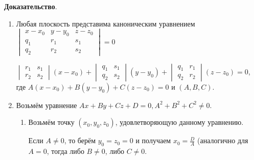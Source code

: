 \documentclass[a4paper]{article}
\begin{document}
    \begin{hproof}
        \textbf{Доказательство}. \begin{enumerate}
                                     \item Любая плоскость представима каноническим уравнением $\begin{vmatrix}
                                                                                                    x-x_0 & y-y_0 & z-z_0 \\
                                                                                                    q_1   & r_1   & s_1   \\
                                                                                                    q_2   & r_2   & s_2
                                     \end{vmatrix} = 0$\newline

                                     $\begin{vmatrix}
                                          r_1 & s_1 \\
                                          r_2 & s_2
                                     \end{vmatrix}(x-x_0)+ \begin{vmatrix}
                                                               q_1 & s_1 \\
                                                               q_2 & s_2
                                     \end{vmatrix} (y-y_0)+ \begin{vmatrix}
                                                                q_1 & r_1 \\
                                                                q_2 & r_2
                                     \end{vmatrix} (z-z_0) = 0$, где $A(x-x_0)+B(y-y_0)+C(z-z_0) = 0$ и $(A,B,C)$.

                                     \item Возьмём уравнение $Ax+By+Cz+D=0, A^2 + B^2 + C^2 \neq 0$.
                                     \begin{enumerate}
                                         \item Возьмём точку $(x_0, y_0, z_0)$, удовлетворяющую данному уравнению.

                                         Если $A\neq 0$, то берём $y_0 = z_0 = 0$ и получаем $\displaystyle x_0 = \frac{D}{A}$ (аналогично для $A=0$, тогда либо $B \neq 0$, либо $C \neq 0$.


\end{enumerate}
\end{enumerate}
\end{hproof}
\end{document}
